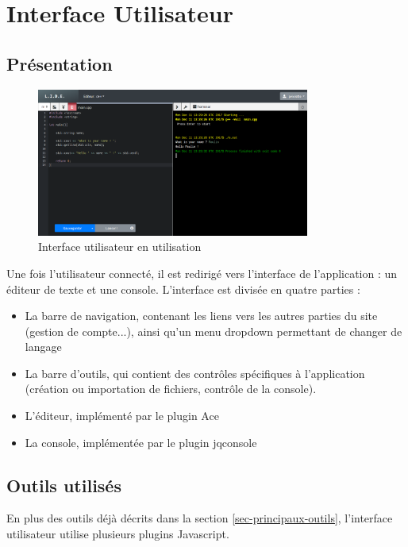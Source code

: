 \chapter{Interface Utilisateur}

\section{Présentation}

\begin{figure}[h]
  \centering
  \includegraphics[width=0.8\textwidth]{./img/frontend/example1.png}
  \caption{Interface utilisateur en utilisation}
  \label{}
\end{figure}

Une fois l'utilisateur connecté, il est redirigé vers l'interface de l'application : un éditeur de texte et une console.
L'interface est divisée en quatre parties :
\begin{itemize}
  \item La barre de navigation, contenant les liens vers les autres parties du site (gestion de compte...), ainsi qu'un menu dropdown permettant de changer de langage
  \item La barre d'outils, qui contient des contrôles spécifiques à l'application (création ou importation de fichiers, contrôle de la console).
  \item L'éditeur, implémenté par le plugin Ace
  \item La console, implémentée par le plugin jqconsole
\end{itemize}

\section{Outils utilisés}
En plus des outils déjà décrits dans la section \ref{sec-principaux-outils}, l'interface utilisateur utilise plusieurs plugins Javascript.

